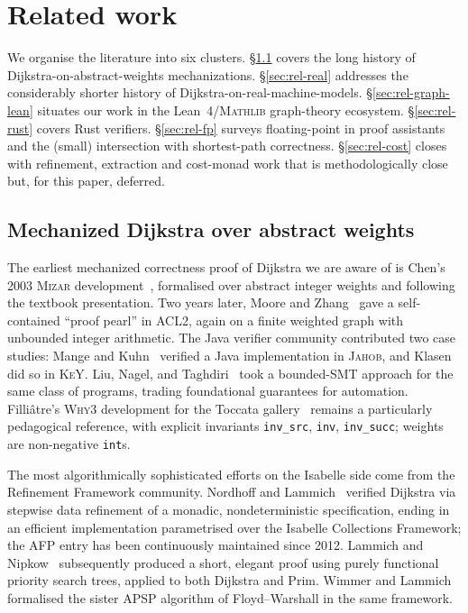 \documentclass[11pt,a4paper]{article}
\newcommand{\Lean}{Lean~4\xspace}
\newcommand{\Mathlib}{\textsc{Mathlib}\xspace}
\newcommand{\Dijkstra}{Dijkstra\xspace}
\newcommand{\code}[1]{\texttt{#1}}
\theoremstyle{plain}
\theoremstyle{definition}
\begin{document}
\section{Related work}\label{sec:related}

We organise the literature into six clusters. \S\ref{sec:rel-abs} covers the
long history of \Dijkstra-on-abstract-weights mechanizations.
\S\ref{sec:rel-real} addresses the considerably shorter history of
\Dijkstra-on-real-machine-models. \S\ref{sec:rel-graph-lean} situates our work
in the \Lean/\Mathlib{} graph-theory ecosystem. \S\ref{sec:rel-rust} covers
Rust verifiers. \S\ref{sec:rel-fp} surveys floating-point in proof assistants
and the (small) intersection with shortest-path correctness.
\S\ref{sec:rel-cost} closes with refinement, extraction and cost-monad work
that is methodologically close but, for this paper, deferred.

\subsection{Mechanized \Dijkstra{} over abstract weights}\label{sec:rel-abs}

The earliest mechanized correctness proof of \Dijkstra{} we are aware of is
Chen's 2003 \textsc{Mizar} development~\cite{Chen2003}, formalised over
abstract integer weights and following the textbook presentation. Two years
later, Moore and Zhang~\cite{MooreZhang2005} gave a self-contained
``proof pearl'' in \textsc{ACL2}, again on a finite weighted graph with
unbounded integer arithmetic. The Java verifier community contributed two
case studies: Mange and Kuhn~\cite{MangeKuhn2007} verified a Java
implementation in \textsc{Jahob}, and Klasen~\cite{Klasen2010} did so in
\textsc{KeY}. Liu, Nagel, and Taghdiri~\cite{LiuNagelTaghdiri2012} took a
bounded-SMT approach for the same class of programs, trading foundational
guarantees for automation. Filliâtre's \textsc{Why3} development for the
Toccata gallery~\cite{Filliatre2011Toccata} remains a particularly
pedagogical reference, with explicit invariants \code{inv\_src}, \code{inv},
\code{inv\_succ}; weights are non-negative \code{int}s.

The most algorithmically sophisticated efforts on the Isabelle side come
from the Refinement Framework community. Nordhoff and
Lammich~\cite{NordhoffLammich2012} verified \Dijkstra{} via stepwise data
refinement of a monadic, nondeterministic specification, ending in an
efficient implementation parametrised over the Isabelle Collections
Framework; the AFP entry has been continuously maintained since 2012.
Lammich and Nipkow~\cite{LammichNipkow2019} subsequently produced a
short, elegant proof using purely functional priority search trees, applied
to both \Dijkstra{} and Prim. Wimmer and Lammich~\cite{WimmerLammich2017}
formalised the sister APSP algorithm of Floyd--Warshall in the same
framework.
\end{document}
